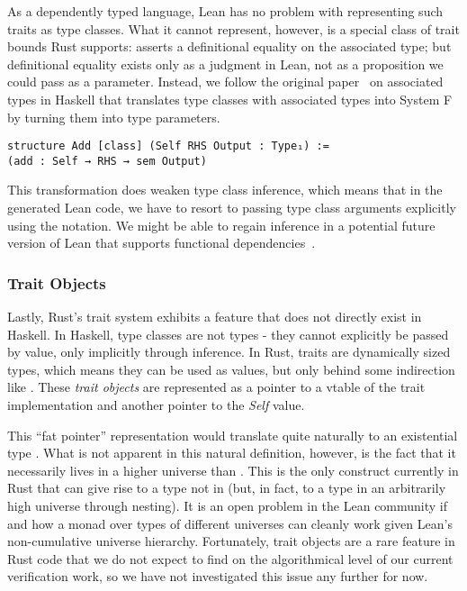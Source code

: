 As a dependently typed language, Lean has no problem with representing such
traits as type classes. What it cannot represent, however, is a special class
of trait bounds Rust supports:  asserts a
definitional equality on the associated type; but definitional equality exists
only as a judgment in Lean, not as a proposition we could pass as a parameter.
Instead, we follow the
original paper~\cite{chakravarty2005associated} on associated types in Haskell
that translates type classes with associated types into System F by turning them
into type parameters.

\begin{verbatim}
structure Add [class] (Self RHS Output : Type₁) :=
(add : Self → RHS → sem Output)
\end{verbatim}

This transformation does weaken type class inference, which means that in the
generated Lean code, we have to resort to passing type class
arguments explicitly using the  notation. We might be able to regain
inference in a potential future version of Lean that supports functional dependencies~\cite{jones2000type}.

\subsubsection{Trait Objects}

Lastly, Rust's trait system exhibits a feature that does not directly exist in
Haskell. In Haskell, type classes are not types - they cannot explicitly be passed by
value, only implicitly through inference. In Rust, traits are dynamically sized
types, which means they can be used as values, but only behind some indirection like
. These \emph{trait objects} are represented as a pointer to a
vtable of the trait implementation and another pointer to the \emph{Self} value.

This ``fat pointer'' representation would translate quite naturally to an existential type
. What is not apparent in this
natural definition, however, is the fact that it necessarily lives in a higher universe
than . This is the only construct currently in Rust that can give rise to a type
not in  (but, in fact, to a type in an arbitrarily high universe through
nesting). It is an open problem in the Lean community if and how a monad over
types of different universes can cleanly work given Lean's non-cumulative
universe hierarchy. Fortunately, trait objects are a rare feature in Rust code
that we do not expect to find on the algorithmical level of our current
verification work, so we have not investigated this issue any further for now.

